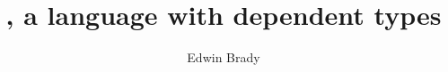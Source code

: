 \documentclass{report}
\begin{document}
\title{\Idris{}, a language with dependent types}
\author{Edwin Brady}

 
\maketitle







%

\end{document}
